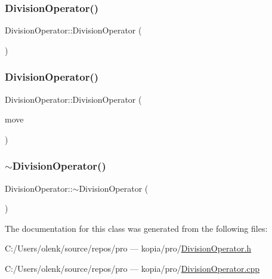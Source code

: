 \subsubsection{\texorpdfstring{DivisionOperator()}{DivisionOperator()}\hspace{0.1cm}{\footnotesize\ttfamily [1/2]}}
{\footnotesize\ttfamily Division\+Operator\+::\+Division\+Operator (\begin{DoxyParamCaption}{ }\end{DoxyParamCaption})}

\mbox{\label{class_division_operator_aa6a6749442a54a8aa94af86f87e51f3a}} 
\subsubsection{\texorpdfstring{DivisionOperator()}{DivisionOperator()}\hspace{0.1cm}{\footnotesize\ttfamily [2/2]}}
{\footnotesize\ttfamily Division\+Operator\+::\+Division\+Operator (\begin{DoxyParamCaption}\item[{\mbox{\hyperlink{class_division_operator}{Division\+Operator}} \&\&}]{move }\end{DoxyParamCaption})}

\mbox{\label{class_division_operator_ae3df9e443621eb682867305efd45c8d5}} 
\subsubsection{\texorpdfstring{$\sim$DivisionOperator()}{~DivisionOperator()}}
{\footnotesize\ttfamily Division\+Operator\+::$\sim$\+Division\+Operator (\begin{DoxyParamCaption}{ }\end{DoxyParamCaption})}



The documentation for this class was generated from the following files\+:\begin{DoxyCompactItemize}
\item 
C\+:/\+Users/olenk/source/repos/pro — kopia/pro/\mbox{\hyperlink{_division_operator_8h}{Division\+Operator.\+h}}\item 
C\+:/\+Users/olenk/source/repos/pro — kopia/pro/\mbox{\hyperlink{_division_operator_8cpp}{Division\+Operator.\+cpp}}\end{DoxyCompactItemize}
